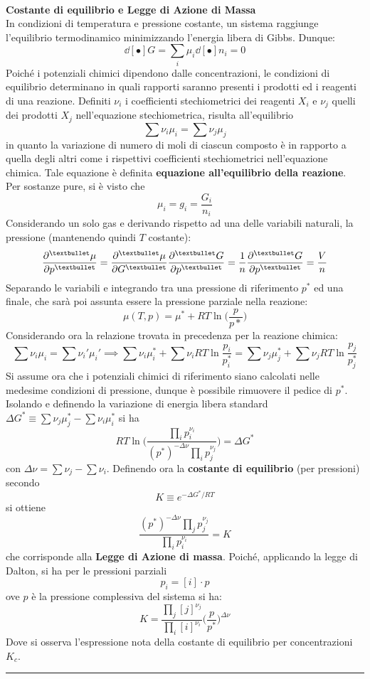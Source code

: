 \documentclass[10pt, oneside]{book}
\newcommand{\infobox}[2]{\vspace{0.5cm}~\\ \textbf{#1} \hrulefill \vspace{0.2cm}\\#2 {}\,\\\hrule \vspace{0.5cm}}
\newcommand{\ds}{\displaystyle}
\begin{document}
\infobox{Costante di equilibrio e Legge di Azione di Massa}{In condizioni di temperatura e pressione costante, un sistema raggiunge l'equilibrio termodinamico minimizzando l'energia libera di Gibbs. Dunque:
\[\dd[•]{G} = \sum_i \mu_i \dd[•]{n_i} = 0\]
Poiché i potenziali chimici dipendono dalle concentrazioni, le condizioni di equilibrio determinano in quali rapporti saranno presenti i prodotti ed i reagenti di una reazione. Definiti $\nu_i$ i coefficienti stechiometrici dei reagenti $X_i$ e $\nu_j$ quelli dei prodotti $X_j$ nell'equazione stechiometrica, risulta all'equilibrio
\[\sum \nu_i \mu_i = \sum \nu_j \mu_j\]
in quanto la variazione di numero di moli di ciascun composto è in rapporto a quella degli altri come i rispettivi coefficienti stechiometrici nell'equazione chimica. Tale equazione è definita \textbf{equazione all'equilibrio della reazione}.\\
Per sostanze pure, si è visto che
\[\mu_i = g_i = \frac{G_i}{n_i}\]
Considerando un solo gas e derivando rispetto ad una delle variabili naturali, la pressione (mantenendo quindi $T$ costante):
\[\pdv[•]{\mu}{p} = \pdv[•]{\mu}{G}\pdv[•]{G}{p} = \frac{1}{n} \pdv[•]{G}{p} = \frac{V}{n}\]
Separando le variabili e integrando tra una pressione di riferimento $p^\ast$ ed una finale, che sarà poi assunta essere la pressione parziale nella reazione:
\[\mu(T,p) = \mu^\ast + RT \ln \bigg( \frac{p}{p*} \bigg)\]
Considerando ora la relazione trovata in precedenza per la reazione chimica:
\[\sum \nu_i \mu_i = \sum \nu_i' \mu_i' \implies \sum \nu_i \mu_i^\ast + \sum \nu_i RT \ln \frac{p_i}{p_i^\ast} =   \sum \nu_j \mu_j^\ast + \sum \nu_j RT \ln \frac{p_j}{p_j^\ast} \]
Si assume ora che i potenziali chimici di riferimento siano calcolati nelle medesime condizioni di pressione, dunque è possibile rimuovere il pedice di $p^\ast$.\\
Isolando e definendo la variazione di energia libera standard $\ds \Delta G^\ast \equiv \sum \nu_j \mu_j^\ast - \sum \nu_i \mu_i^\ast$ si ha
\[RT \ln \bigg( \frac{\ds \prod_i p_i^{\nu_i}}{\ds (p^\ast)^{-\Delta \nu} \prod_i p_j^{\nu_j}} \bigg) = \Delta G^\ast\]
con $\ds \Delta \nu = \sum \nu_j - \sum \nu_i$. Definendo ora la \textbf{costante di equilibrio} (per pressioni) secondo
\[K \equiv e^{\ds - \Delta G^\ast \big/ RT}\]
si ottiene
\[\frac{(p^\ast)^{-\Delta \nu} \prod_j p_j^{\nu_j}}{\prod_i p_i^{\nu_i}} = K\]
che corrisponde alla \textbf{Legge di Azione di massa}. Poiché, applicando la legge di Dalton, si ha per le pressioni parziali
\[p_i = [i] \cdot p\]
ove $p$ è la pressione complessiva del sistema si ha:
\[K = \frac{\prod_j [j]^{\nu_j}}{\prod_i [i]^{\nu_i}} \bigg(\frac{p}{p^\ast}\bigg)^{\Delta \nu}\]
Dove si osserva l'espressione nota della costante di equilibrio per concentrazioni $K_c$.
}
\end{document}
